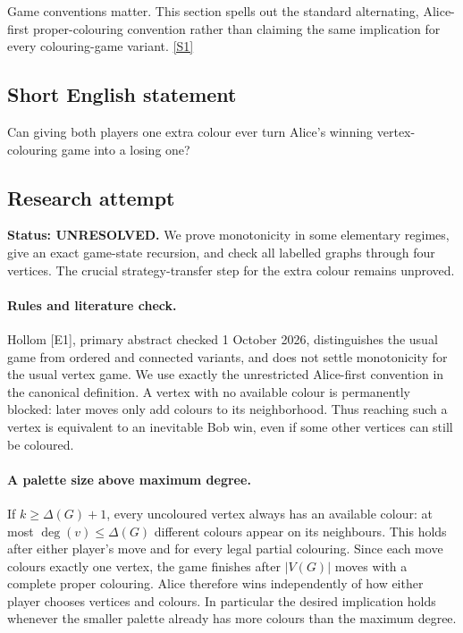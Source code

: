 \documentclass[11pt,a4paper]{article}
\newcommand{\sref}[2]{\hyperlink{source:#1:#2}{[S#2]}}
\begin{document}
Game conventions matter. This section spells out the standard alternating, Alice-first proper-colouring convention rather than claiming the same implication for every colouring-game variant. \sref{statement}{1}

\subsection{Short English statement}

Can giving both players one extra colour ever turn Alice’s winning vertex-colouring game into a losing one?

\subsection{Research attempt}
\textbf{Status: UNRESOLVED.} We prove monotonicity in some elementary regimes, give an exact game-state recursion, and check all labelled graphs through four vertices. The crucial strategy-transfer step for the extra colour remains unproved.

\paragraph{Rules and literature check.}
Hollom [E1], primary abstract checked 1 October 2026, distinguishes the usual game from ordered and connected variants, and does not settle monotonicity for the usual vertex game. We use exactly the unrestricted Alice-first convention in the canonical definition. A vertex with no available colour is permanently blocked: later moves only add colours to its neighborhood. Thus reaching such a vertex is equivalent to an inevitable Bob win, even if some other vertices can still be coloured.

\paragraph{A palette size above maximum degree.}
If $k\ge\Delta(G)+1$, every uncoloured vertex always has an available colour: at most $\deg(v)\le\Delta(G)$ different colours appear on its neighbours. This holds after either player's move and for every legal partial colouring. Since each move colours exactly one vertex, the game finishes after $|V(G)|$ moves with a complete proper colouring. Alice therefore wins independently of how either player chooses vertices and colours. In particular the desired implication holds whenever the smaller palette already has more colours than the maximum degree.
\end{document}
